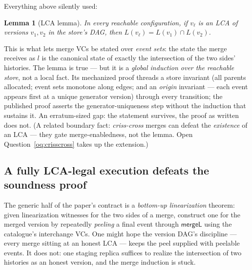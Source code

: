 \documentclass[11pt]{article}
\newtheorem{lemma}[theorem]{Lemma}
\newcommand{\mergeL}{\mathsf{mergeL}}
\begin{document}
Everything above silently used:

\begin{lemma}[LCA lemma]
\label{lem:lca}
In every reachable configuration, if $v_\ell$ is an LCA of versions $v_1,
v_2$ in the store's DAG, then $L(v_\ell) = L(v_1) \cap L(v_2)$.
\end{lemma}

This is what lets merge VCs be stated over \emph{event sets}: the state
the merge receives as $l$ is the canonical state of exactly the
intersection of the two sides' histories. The lemma is true --- but it is
a \emph{global induction over the reachable store}, not a local fact. Its
mechanized proof threads a store invariant (all parents allocated; event
sets monotone along edges; and an \emph{origin} invariant --- each event
appears first at a unique generator version) through every transition; the
published proof asserts the generator-uniqueness step without the
induction that sustains it. An erratum-sized gap: the statement survives,
the proof as written does not. (A related boundary fact:
\emph{criss-cross} merges can defeat the \emph{existence} of an
LCA --- they gate merge-enabledness, not the lemma. Open
Question~\ref{oq:crisscross} takes up the extension.)

\subsection{A fully LCA-legal execution defeats the soundness proof}
\label{sec:defeater}

The generic half of the paper's contract is a \emph{bottom-up
linearization} theorem: given linearization witnesses for the two sides
of a merge, construct one for the merged version by repeatedly
\emph{peeling} a final event through $\mergeL$ using the catalogue's
interchange VCs. One might hope the version DAG's discipline --- every
merge sitting at an honest LCA --- keeps the peel supplied with peelable
events. It does not: one staging replica suffices to realize the
intersection of two histories as an honest version, and the merge
induction is stuck.
\end{document}
